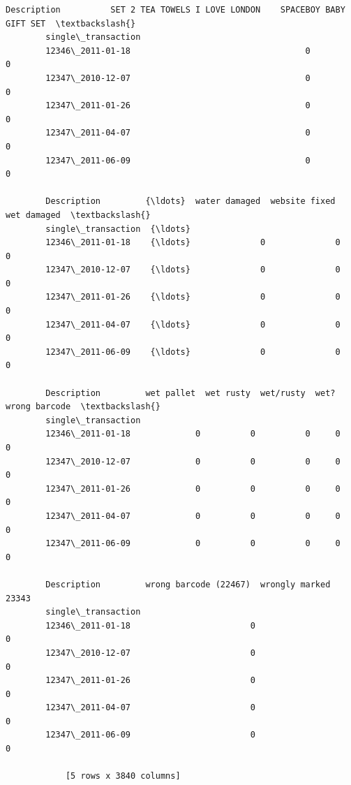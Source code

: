 \documentclass[11pt]{article}
\begin{document}
\begin{tcolorbox}[breakable, size=fbox, boxrule=.5pt, pad at break*=1mm, opacityfill=0]
\begin{Verbatim}[commandchars=\\\{\}]
        Description          SET 2 TEA TOWELS I LOVE LONDON    SPACEBOY BABY GIFT SET  \textbackslash{}
        single\_transaction
        12346\_2011-01-18                                   0                        0
        12347\_2010-12-07                                   0                        0
        12347\_2011-01-26                                   0                        0
        12347\_2011-04-07                                   0                        0
        12347\_2011-06-09                                   0                        0

        Description         {\ldots}  water damaged  website fixed  wet damaged  \textbackslash{}
        single\_transaction  {\ldots}
        12346\_2011-01-18    {\ldots}              0              0            0
        12347\_2010-12-07    {\ldots}              0              0            0
        12347\_2011-01-26    {\ldots}              0              0            0
        12347\_2011-04-07    {\ldots}              0              0            0
        12347\_2011-06-09    {\ldots}              0              0            0

        Description         wet pallet  wet rusty  wet/rusty  wet?  wrong barcode  \textbackslash{}
        single\_transaction
        12346\_2011-01-18             0          0          0     0              0
        12347\_2010-12-07             0          0          0     0              0
        12347\_2011-01-26             0          0          0     0              0
        12347\_2011-04-07             0          0          0     0              0
        12347\_2011-06-09             0          0          0     0              0

        Description         wrong barcode (22467)  wrongly marked 23343
        single\_transaction
        12346\_2011-01-18                        0                     0
        12347\_2010-12-07                        0                     0
        12347\_2011-01-26                        0                     0
        12347\_2011-04-07                        0                     0
        12347\_2011-06-09                        0                     0

            [5 rows x 3840 columns]
    \end{Verbatim}
\end{tcolorbox}
\end{document}
